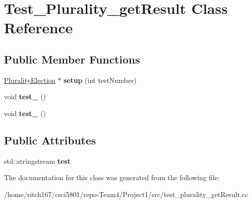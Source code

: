 \hypertarget{classTest__Plurality__getResult}{}\section{Test\+\_\+\+Plurality\+\_\+get\+Result Class Reference}
\label{classTest__Plurality__getResult}
\subsection*{Public Member Functions}
\begin{DoxyCompactItemize}
\item 
\mbox{\label{classTest__Plurality__getResult_a9d3daa59e7710448e9c009d2f96a2234}} 
\hyperlink{classPluralityElection}{Plurality\+Election} $\ast$ {\bfseries setup} (int test\+Number)
\item 
\mbox{\label{classTest__Plurality__getResult_a9bed2135b2d5297d2678de47a6519052}} 
void {\bfseries test\+\_} ()
\item 
\mbox{\label{classTest__Plurality__getResult_aa70562bc647d9ccd98967c49374c501d}} 
void {\bfseries test\+\_} ()
\end{DoxyCompactItemize}
\subsection*{Public Attributes}
\begin{DoxyCompactItemize}
\item 
\mbox{\label{classTest__Plurality__getResult_a13ec538eef9bdd56c63125c932c81900}} 
std\+::stringstream {\bfseries test}
\end{DoxyCompactItemize}


The documentation for this class was generated from the following file\+:\begin{DoxyCompactItemize}
\item 
/home/ritch167/csci5801/repo-\/\+Team4/\+Project1/src/test\+\_\+plurality\+\_\+get\+Result.\+cc\end{DoxyCompactItemize}
